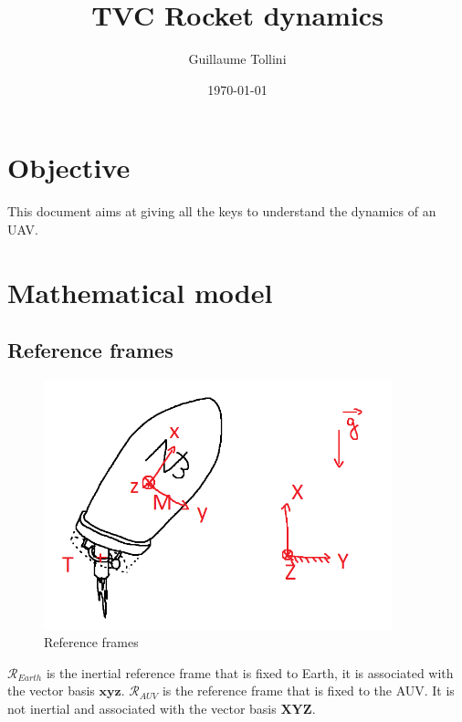 \documentclass[a4paper, 12 pt]{article}
\author{Guillaume Tollini}
\title{TVC Rocket dynamics}
\date{\vfill \today}
\begin{document}
\maketitle

\newpage

\section*{Objective}
This document aims at giving all the keys to understand the dynamics of an UAV.

\newpage

\tableofcontents

\newpage


\section{Mathematical model}
\subsection{Reference frames}
\begin{figure}[!h]
\hspace{0 cm}
\includegraphics[width=0.9\textwidth]{schema-fusee.png}
\caption{Reference frames}
\end{figure}

$\mathcal{R}_{Earth}$ is the inertial reference frame that is fixed to Earth, it is associated with the vector basis $\bm x\bm y\bm z$. $\mathcal{R}_{AUV}$ is the reference frame that is fixed to the AUV. It is not inertial and associated with the vector basis $\bm X\bm Y\bm Z$.
\end{document}
